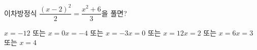 이차방정식 $\dfrac{(x-2)^2}{2}=\dfrac{x^2+6}{3}$을 풀면?
\begin{choicesii}{$x=-12$ 또는 $x=0$}{$x=-4$ 또는 $x=-3$}{$x=0$ 또는 $x=12$}{$x=2$ 또는 $x=6$}{$x=3$ 또는 $x=4$}\end{choicesii}

